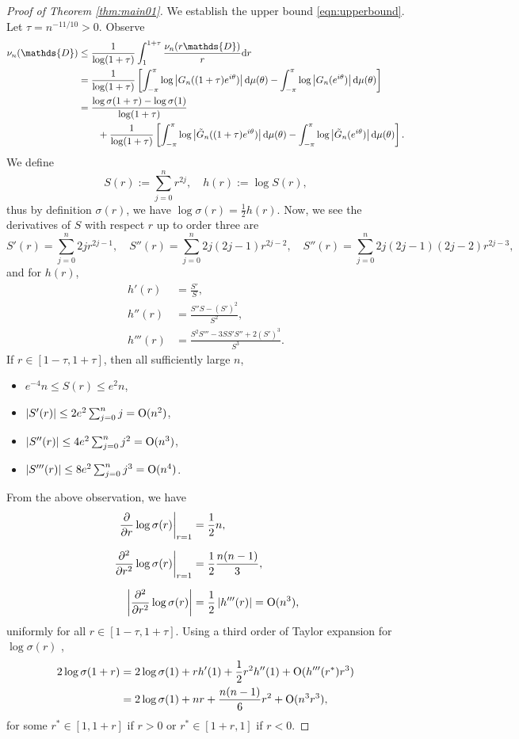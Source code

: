 \documentclass[12pt]{amsart}
\theoremstyle{plain}
\numberwithin{equation}{section}
\newcommand{\<}{\langle}
\renewcommand{\>}{\rangle}
\newcommand{\CC}[1]{\left[#1\right]}
\newcommand{\dd}{\textnormal{d}}
\newcommand{\abs}[1]{\left|#1\right|}
\begin{document}
\begin{proof}[Proof of Theorem \ref{thm:main01}]
We establish the upper bound \ref{eqn:upperbound}. Let $\tau=n^{-11/10} > 0$. Observe
\begin{align}
\nu_n(\mathds{D}) & \leq \frac{1}{\log(1+\tau)} \int_{1}^{1+\tau} \frac{\nu_n(r\mathds{D})}{r} \dd r \nonumber\\
& = \frac{1}{\log(1+\tau)} \CC{\int_{-\pi}^{\pi} \log \abs{G_n((1+\tau)e^{i\theta})} \dd \mu(\theta) - \int_{-\pi}^{\pi} \log \abs{G_n(e^{i\theta})} \dd \mu(\theta)} \nonumber\\
& = \frac{\log\sigma(1+\tau)-\log\sigma(1)}{\log(1+\tau)} \nonumber\\ 
& \quad\quad + \frac{1}{\log(1+\tau)} \CC{\int_{-\pi}^{\pi} \log \abs{\tilde{G}_n((1+\tau)e^{i\theta})} \dd \mu(\theta) - \int_{-\pi}^{\pi} \log \abs{\tilde{G}_n(e^{i\theta})} \dd \mu(\theta)}.
\end{align}
We define 
\[
S(r):=\sum_{j=0}^n r^{2j},\quad h(r):= \log S(r),
\]
thus by definition $\sigma(r)$, we have $\log \sigma(r) = \frac{1}{2}h(r)$. Now, we see the derivatives of $S$ with respect $r$ up to order three are
\[
S'(r) = \sum_{j=0}^n 2jr^{2j-1},  \quad S''(r)  = \sum_{j=0}^n 2j(2j-1)r^{2j-2}, \quad S''(r)  = \sum_{j=0}^n 2j(2j-1)(2j-2)r^{2j-3},
\]
and for $h(r)$,
\begin{align*}
h'(r) & = \frac{S'}{S}, \\[6pt]
h''(r) & = \frac{S''S-(S')^2}{S^2}, \\[6pt]
h'''(r) & = \frac{S^2S''' - 3 SS'S'' + 2(S')^3}{S^3}.
\end{align*}
If $r\in[1-\tau,1+\tau]$, then all sufficiently large $n$,
\begin{itemize}
\setlength{\itemsep}{6pt}
\item $e^{-4} n \leq S(r) \leq e^2 n$, 
\item $\abs{S'(r)} \leq 2e^2 \sum_{j=0}^n j = \textnormal{O}(n^2)$,
\item $\abs{S''(r)} \leq 4e^2 \sum_{j=0}^n j^2 = \textnormal{O}(n^3)$,
\item $\abs{S'''(r)} \leq 8e^2 \sum_{j=0}^n j^3 = \textnormal{O}(n^4)$.
\end{itemize}

From the above observation, we have
\begin{align*}
\left. \frac{\partial}{\partial r} \log\sigma(r) \right|_{r=1} & = \frac{1}{2} n, \\[6pt]
\left. \frac{\partial^2}{\partial r^2} \log\sigma(r) \right|_{r=1} & = \frac{1}{2} \frac{n(n-1)}{3}, \\[6pt]
\abs{ \frac{\partial^2}{\partial r^2} \log\sigma(r) } & =  \frac{1}{2}\abs{h'''(r)} = \textnormal{O}(n^3), 
\end{align*}
uniformly for all $r\in[1-\tau,1+\tau]$.
Using a third order of Taylor expansion for $\log\sigma(r)$ ,
\begin{align*}
2\log\sigma(1+r) & = 2\log\sigma(1) + r h'(1) + \frac{1}{2}r^2 h''(1) + \textnormal{O}(h'''(r^*)r^3) \\
& = 2\log\sigma(1)+ nr +\frac{n(n-1)}{6} r^2 + \textnormal{O}(n^3r^3),
\end{align*}
for some $r^*\in[1,1+r]$ if $r>0$ or $r^*\in[1+r,1]$ if $r<0$.


\end{proof}
\end{document}
